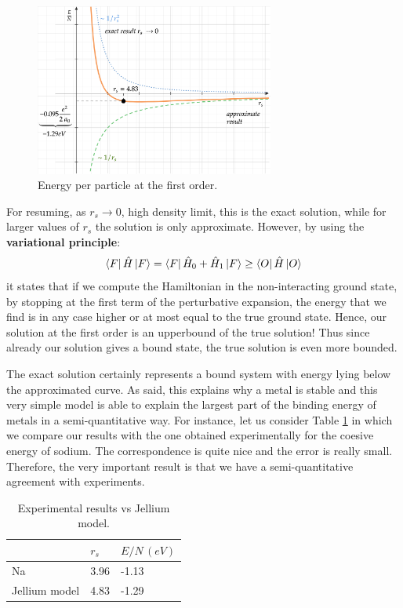 \documentclass[../main/main.tex]{subfiles}
\begin{document}
\begin{figure}[h!]
\centering
\includegraphics[width=0.7\textwidth]{../lessons/6_image/7.png}
\caption{\label{fig:6_4} Energy per particle at the first order.}
\end{figure}

For resuming, as \( r_s \rightarrow 0 \), high density limit, this is the exact solution, while for larger values of \( r_s \) the solution is only approximate. However, by using the \textbf{variational principle}:
\begin{equation*}
  \bra{F} \hat{H} \ket{F} = \bra{F} \hat{H}_0 + \hat{H}_1  \ket{F} \ge \bra{O} \hat{H} \ket{O}
\end{equation*}
it states that if we compute the Hamiltonian in the non-interacting ground state, by stopping at the first term of the perturbative expansion, the energy that we find is in any case higher or at most equal to the true ground state. Hence, our solution at the first order is an upperbound of the true solution!
Thus since already our solution gives a bound state, the true solution is even more bounded.

The exact solution certainly represents a bound system with energy lying below the approximated curve. As said, this explains why a metal is stable and this very simple model is able to explain the largest part of the binding energy of metals in a semi-quantitative way. For instance, let us consider Table \ref{table:6_1} in which we compare our results with the one obtained experimentally for the coesive energy of sodium. The correspondence is quite nice and the error is really small.
Therefore, the very important result is that we have a semi-quantitative agreement with experiments.

\begin{table}[h!]
\centering
\begin{tabular}{lll}
\toprule
  & \(r_s\) & \(E/N \,(eV)\) \\
\midrule
Na & 3.96 & -1.13 \\
Jellium model & 4.83 & -1.29 \\
\bottomrule
\end{tabular}
\caption{\label{table:6_1} Experimental results vs Jellium model.}
\end{table}
\end{document}
